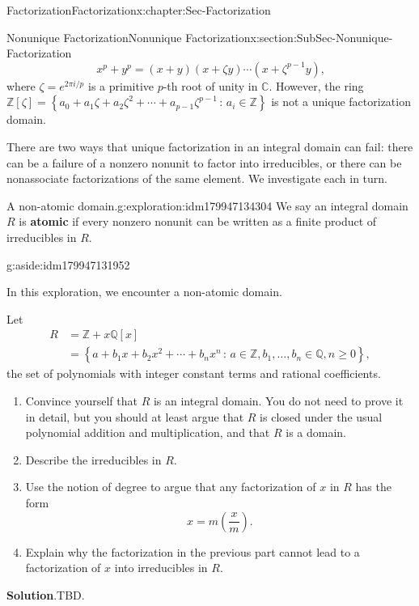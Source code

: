 \documentclass[oneside,10pt,]{book}
\newcommand{\blocktitlefont}{\relax}
\newcommand{\terminology}[1]{\textbf{#1}}
\numberwithin{equation}{section}
\renewcommand{\ge}{\geqslant}
\newcommand{\setof}[2]{{\left\{#1\,\colon\,#2\right\}}}
\def\C{{\mathbb C}}
\def\Z{{\mathbb Z}}
\def\Q{{\mathbb Q}}
\newcommand{\amp}{&}
\begin{document}
\begin{chapterptx}{Factorization}{}{Factorization}{}{}{x:chapter:Sec-Factorization}
\begin{sectionptx}{Nonunique Factorization}{}{Nonunique Factorization}{}{}{x:section:SubSec-Nonunique-Factorization}
\begin{equation*}
x^p + y^p = (x+y)(x+\zeta y) \cdots (x+\zeta^{p-1}y)\text{,}
\end{equation*}
where \(\zeta = e^{2\pi i/p}\) is a primitive \(p\)-th root of unity in \(\C\). However, the ring \(\Z[\zeta] = \setof{a_0 + a_1 \zeta + a_2 \zeta^2 + \cdots + a_{p-1} \zeta^{p-1}}{a_i\in\Z}\) is not a unique factorization domain.%
\par
There are two ways that unique factorization in an integral domain can fail: there can be a failure of a nonzero nonunit to factor into irreducibles, or there can be nonassociate factorizations of the same element. We investigate each in turn.%
\begin{exploration}{A non-atomic domain.}{g:exploration:idm179947134304}%
We say an integral domain \(R\) is \terminology{atomic} if every nonzero nonunit can be written as a finite product of irreducibles in \(R\). \begin{aside}{}{g:aside:idm179947131952}%
\end{aside}
 In this exploration, we encounter a non-atomic domain.%
\par
Let%
\begin{align*}
R \amp = \Z + x\Q[x]\\
\amp = \setof{a + b_1 x + b_2 x^2 + \cdots + b_n x^n}{a\in \Z, b_1,\ldots, b_n \in \Q, n\ge 0},
\end{align*}
the set of polynomials with integer constant terms and rational coefficients.%
%
\begin{enumerate}
\item{}Convince yourself that \(R\) is an integral domain. You do not need to prove it in detail, but you should at least argue that \(R\) is closed under the usual polynomial addition and multiplication, and that \(R\) is a domain.%
\item{}Describe the irreducibles in \(R\).%
\item{}Use the notion of degree to argue that any factorization of \(x\) in \(R\) has the form%
\begin{equation*}
x = m\left(\frac{x}{m}\right).
\end{equation*}
%
\item{}Explain why the factorization in the previous part cannot lead to a factorization of \(x\) into irreducibles in \(R\).%
\end{enumerate}
\par\smallskip%
\noindent\textbf{\blocktitlefont Solution}.\hypertarget{g:solution:idm179947123696}{}\quad{}TBD.\end{exploration}

\end{sectionptx}
\end{chapterptx}
\end{document}
